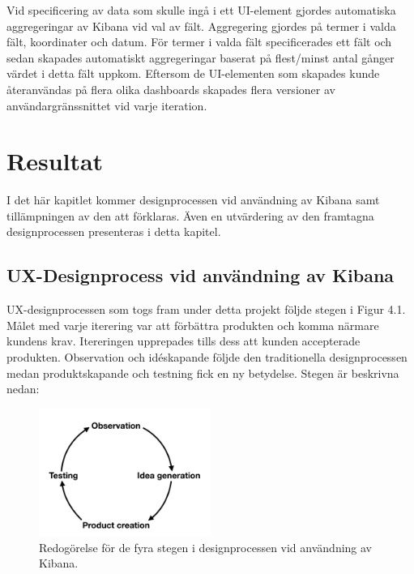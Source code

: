 \documentclass[12pt]{kththesis}
\begin{document}
Vid specificering av data som skulle ingå i ett UI-element gjordes automatiska aggregeringar av Kibana vid val av fält. Aggregering gjordes på termer i valda fält, koordinater och datum. För termer i valda fält specificerades ett fält och sedan skapades automatiskt aggregeringar baserat på flest/minst antal gånger värdet i detta fält uppkom. Eftersom de UI-elementen som skapades kunde återanvändas på flera olika dashboards skapades flera versioner av användargränssnittet vid varje iteration. 

\afterpage{\null\newpage}

\chapter{Resultat}

I det här kapitlet kommer designprocessen vid användning av Kibana samt tillämpningen av den att förklaras. Även en utvärdering av den framtagna designprocessen presenteras i detta kapitel. 

\section{UX-Designprocess vid användning av Kibana}

UX-designprocessen som togs fram under detta projekt följde stegen i Figur 4.1. Målet med varje iterering var att förbättra produkten och komma närmare kundens krav. Itereringen upprepades tills dess att kunden accepterade produkten. Observation och idéskapande följde den traditionella designprocessen medan produktskapande och testning fick en ny betydelse. Stegen är beskrivna nedan:

\begin{figure}[h]

\centering
\includegraphics[width=0.5\textwidth]{ProductCreation}
\caption{Redogörelse för de fyra stegen i designprocessen vid användning av Kibana.}
\end{figure}
\end{document}
